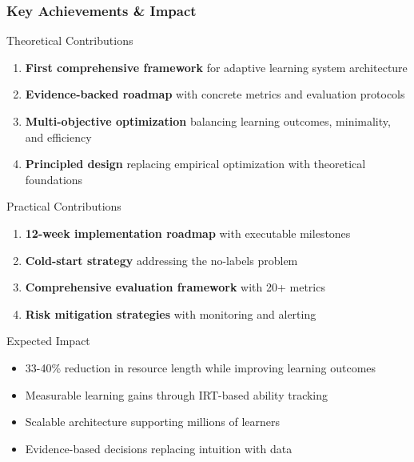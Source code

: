 \documentclass[aspectratio=169]{beamer}
\begin{document}
\begin{frame}
\frametitle{Key Achievements \& Impact}
\begin{block}{Theoretical Contributions}
\begin{enumerate}
\item \textbf{First comprehensive framework} for adaptive learning system architecture
\item \textbf{Evidence-backed roadmap} with concrete metrics and evaluation protocols
\item \textbf{Multi-objective optimization} balancing learning outcomes, minimality, and efficiency
\item \textbf{Principled design} replacing empirical optimization with theoretical foundations
\end{enumerate}
\end{block}

\begin{block}{Practical Contributions}
\begin{enumerate}
\item \textbf{12-week implementation roadmap} with executable milestones
\item \textbf{Cold-start strategy} addressing the no-labels problem
\item \textbf{Comprehensive evaluation framework} with 20+ metrics
\item \textbf{Risk mitigation strategies} with monitoring and alerting
\end{enumerate}
\end{block}

\begin{block}{Expected Impact}
\begin{itemize}
\item \textcolor{mygreen}{33-40\% reduction} in resource length while improving learning outcomes
\item \textcolor{mygreen}{Measurable learning gains} through IRT-based ability tracking
\item \textcolor{mygreen}{Scalable architecture} supporting millions of learners
\item \textcolor{mygreen}{Evidence-based decisions} replacing intuition with data
\end{itemize}
\end{block}
\end{frame}
\end{document}
